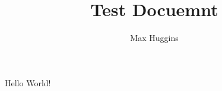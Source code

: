 \documentclass[letterpaper,12pt]{article}
\begin{document}
\author{Max Huggins}

\title{Test Docuemnt}
\maketitle

Hello World!
\end{document}
